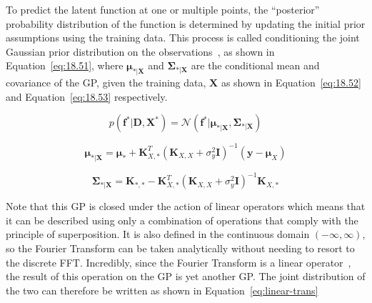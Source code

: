 \documentclass[12pt]{article}
\begin{document}
    To predict the latent function at one or multiple points, the ``posterior'' probability distribution of the function is determined by updating the initial prior assumptions using the training data.
    This process is called conditioning the joint Gaussian prior distribution on the observations~\cite{rasmussen2006gaussian}, as shown in Equation~\ref{eq:18.51}, where $\boldsymbol{\mu}_{*\vert \mathbf{X}}$ and $\boldsymbol{\Sigma}_{*\vert \mathbf{X}}$ are the conditional mean and covariance of the GP, given the training data, $\mathbf{X}$ as shown in Equation~\ref{eq:18.52} and Equation~\ref{eq:18.53} respectively.

    \begin{equation}
        p(\mathbf{f}^* \vert \mathbf{D}, \mathbf{X}^*) = \mathcal{N}(\mathbf{f}^* \vert \boldsymbol{\mu}_{*\vert \mathbf{X}}, \boldsymbol{\Sigma}_{*\vert \mathbf{X}})\label{eq:18.51}
    \end{equation}

    \begin{equation}
        \boldsymbol{\mu}_{*\vert \mathbf{X}} = \boldsymbol{\mu}_* + \mathbf{K}_{X,*}^T (\mathbf{K}_{X,X} + \sigma^2_y \mathbf{I})^{-1} (\mathbf{y} - \boldsymbol{\mu}_X)\label{eq:18.52}
    \end{equation}

    \begin{equation}
        \boldsymbol{\Sigma}_{*\vert \mathbf{X}} = \mathbf{K}_{*,*} - \mathbf{K}_{X,*}^T (\mathbf{K}_{X,X} + \sigma^2_y \mathbf{I})^{-1} \mathbf{K}_{X,*}\label{eq:18.53}
    \end{equation}


    Note that this GP is closed under the action of linear operators which means that it can be described using only a combination of operations that comply with the principle of superposition.
    It is also defined in the continuous domain $(-\infty, \infty)$, so the Fourier Transform can be taken analytically without needing to resort to the discrete FFT\@.
    Incredibly, since the Fourier Transform is a linear operator~\cite{Jidling2017}, the result of this operation on the GP is yet another GP. The joint distribution of the two can therefore be written as shown in Equation~\ref{eq:linear-trans}
\end{document}
